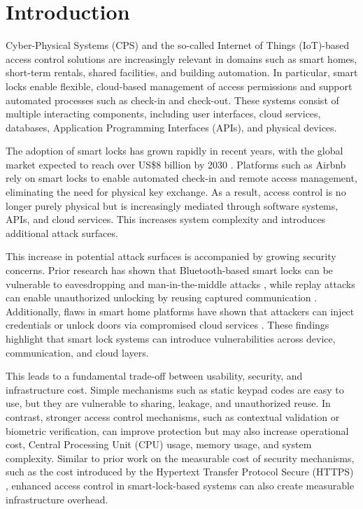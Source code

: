 \section{Introduction}

Cyber-Physical Systems (CPS) and the so-called Internet of Things (IoT)-based access control solutions are increasingly relevant in domains such as smart homes, short-term rentals, shared facilities, and building automation. In particular, smart locks enable flexible, cloud-based management of access permissions and support automated processes such as check-in and check-out. These systems consist of multiple interacting components, including user interfaces, cloud services, databases, Application Programming Interfaces (APIs), and physical devices.

The adoption of smart locks has grown rapidly in recent years, with the global market expected to reach over US\$8 billion by 2030 \cite{refMarket}. Platforms such as Airbnb rely on smart locks to enable automated check-in and remote access management, eliminating the need for physical key exchange. As a result, access control is no longer purely physical but is increasingly mediated through software systems, APIs, and cloud services. This increases system complexity and introduces additional attack surfaces.

This increase in potential attack surfaces is accompanied by growing security concerns. Prior research has shown that Bluetooth-based smart locks can be vulnerable to eavesdropping and man-in-the-middle attacks \cite{refBluetooth}, while replay attacks can enable unauthorized unlocking by reusing captured communication \cite{diao2025masterlock}. Additionally, flaws in smart home platforms have shown that attackers can inject credentials or unlock doors via compromised cloud services \cite{refSmartHome}. These findings highlight that smart lock systems can introduce vulnerabilities across device, communication, and cloud layers.

This leads to a fundamental trade-off between usability, security, and infrastructure cost. Simple mechanisms such as static keypad codes are easy to use, but they are vulnerable to sharing, leakage, and unauthorized reuse. In contrast, stronger access control mechanisms, such as contextual validation or biometric verification, can improve protection but may also increase operational cost, Central Processing Unit (CPU) usage, memory usage, and system complexity. Similar to prior work on the measurable cost of security mechanisms, such as the cost introduced by the Hypertext Transfer Protocol Secure (HTTPS) \cite{naylor2014cost}, enhanced access control in smart-lock-based systems can also create measurable infrastructure overhead.

